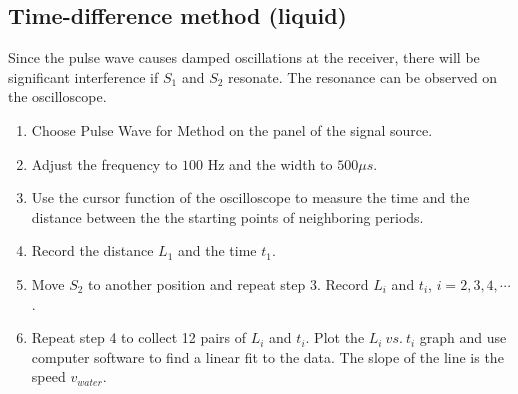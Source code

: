 \subsection{Time-difference method (liquid)}
Since the pulse wave causes damped oscillations at the receiver, there will
be significant interference if $S_1$ and $S_2$ resonate. The resonance can
be observed on the oscilloscope. 

\begin{enumerate}
    \item Choose Pulse Wave for Method on the panel of the signal source.
    \item Adjust the frequency to $100$ Hz and the width to $500 \mu s$.
    \item Use the cursor function of the oscilloscope to measure the time
      and the distance between the the starting points of neighboring
      periods. 
    \item Record the distance $L_1$ and the time $t_1$.
    \item Move $S_2$ to another position and repeat step 3. Record $L_i$ and
      $t_i$, $i = 2, 3, 4, \cdots$. 
    \item Repeat step 4 to collect 12 pairs of $L_i$ and $t_i$. Plot the
      $L_i\ vs.\ t_i$ graph and use computer software to find a linear fit
      to the data. The slope of the line is the speed $v_{water}$. 
\end{enumerate}
